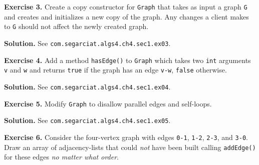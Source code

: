 \documentclass[12pt, a4paper]{article}
\newenvironment{ex}[2][Exercise]
{\par\medskip\noindent \textbf{#1 #2.}}
{\medskip}
\newenvironment{sol}[1][Solution]
{\par\medskip\noindent \textbf{#1.} }
{\medskip}
\begin{document}
	\begin{ex}{3}
		Create a copy constructor for \texttt{Graph} that takes as input a graph
		\texttt{G} and creates and initializes a new copy of the graph. Any changes
		a client makes to \texttt{G} should not affect the newly created graph.
	\end{ex}
	\begin{sol}
		See \texttt{com.segarciat.algs4.ch4.sec1.ex03}.
	\end{sol}
	\begin{ex}{4}
		Add a method \texttt{hasEdge()} to \texttt{Graph} which takes two \texttt{int}
		arguments \texttt{v} and \texttt{w} and returns \texttt{true} if the graph has
		an edge \texttt{v-w}, \texttt{false} otherwise.
	\end{ex}
	\begin{sol}
		See \texttt{com.segarciat.algs4.ch4.sec1.ex04}.
	\end{sol}
	\begin{ex}{5}
		Modify \texttt{Graph} to disallow parallel edges and self-loops.
	\end{ex}
	\begin{sol}
		See \texttt{com.segarciat.algs4.ch4.sec1.ex05}.
	\end{sol}
	\begin{ex}{6}
		Consider the four-vertex graph with edges \texttt{0-1}, \texttt{1-2}, \texttt{2-3},
		and \texttt{3-0}. Draw an array of adjacency-lists that could \emph{not} have been
		built calling \texttt{addEdge()} for these edges \emph{no matter what order}.
	\end{ex}
\end{document}
